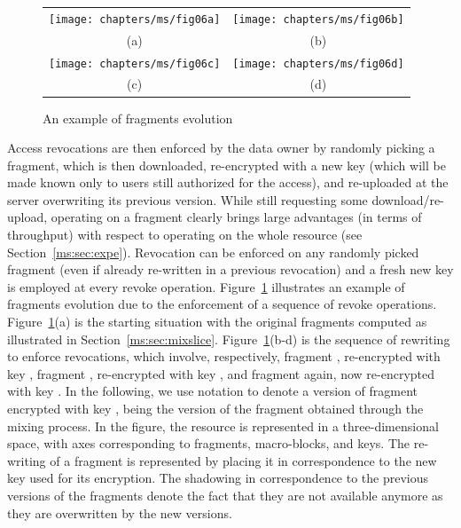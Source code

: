 \begin{figure}[!t]
\setlength{\tabcolsep}{0.01cm}
\begin{tabular}{cc}
\texttt{[image: chapters/ms/fig06a]}&
\texttt{[image: chapters/ms/fig06b]}\\
{\scriptsize (a)} & {\scriptsize (b)} \\
\texttt{[image: chapters/ms/fig06c]}&
\texttt{[image: chapters/ms/fig06d]}\\
{\scriptsize (c)} & {\scriptsize (d)}\\
\end{tabular}
\caption{\label{ms:fig:pu}An example of fragments evolution}
\end{figure}

Access revocations are then enforced by the data owner by randomly picking a fragment, which is then downloaded, re-encrypted with a new key (which will be made known only to users still authorized for the access), and re-uploaded at the server overwriting its previous version. While still requesting some download/re-upload, operating on a fragment clearly brings large advantages (in terms of throughput) with respect to operating on the whole resource (see Section~\ref{ms:sec:expe}). Revocation can be enforced on any randomly picked fragment (even if already re-written in a previous revocation) and a fresh new key is employed at every revoke operation. Figure~\ref{ms:fig:pu} illustrates an example of fragments evolution due to the enforcement of a sequence of revoke operations. Figure~\ref{ms:fig:pu}(a) is the starting situation with the original fragments computed as illustrated in Section~\ref{ms:sec:mixslice}. Figure~\ref{ms:fig:pu}(b-d) is the sequence of rewriting to enforce revocations, which involve, respectively, fragment , re-encrypted with key , fragment , re-encrypted with key , and fragment  again, now re-encrypted with key . In the following, we use notation  to denote a version of fragment  encrypted with key , being  the version of the fragment obtained through the mixing process. In the figure, the resource is represented in a three-dimensional space, with axes corresponding to fragments, macro-blocks, and keys. The re-writing of a fragment is represented by placing it in correspondence to the new key used for its encryption. The shadowing in correspondence to the previous versions of the fragments denote the fact that they are not available anymore as they are overwritten by the new versions.


